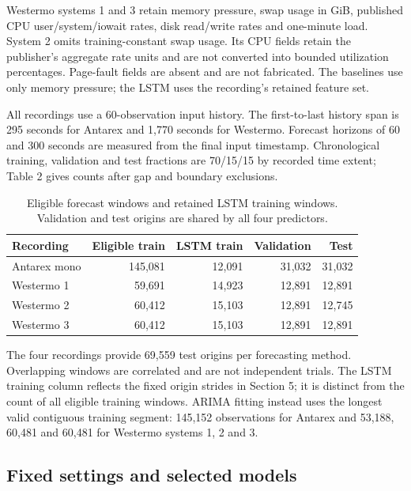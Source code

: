 \documentclass[10pt,a4paper,twocolumn]{article}
\begin{document}
Westermo systems 1 and 3 retain memory pressure, swap usage in GiB, published CPU user/system/iowait rates, disk read/write rates and one-minute load. System 2 omits training-constant swap usage. Its CPU fields retain the publisher's aggregate rate units and are not converted into bounded utilization percentages. Page-fault fields are absent and are not fabricated. The baselines use only memory pressure; the LSTM uses the recording's retained feature set.

All recordings use a 60-observation input history. The first-to-last history span is 295 seconds for Antarex and 1,770 seconds for Westermo. Forecast horizons of 60 and 300 seconds are measured from the final input timestamp. Chronological training, validation and test fractions are 70/15/15 by recorded time extent; Table 2 gives counts after gap and boundary exclusions.

\begin{table}[tbp]
\centering
\caption{Eligible forecast windows and retained LSTM training windows. Validation and test origins are shared by all four predictors.}
\label{tab:2}
\fontsize{8.5}{10.2}\selectfont
\setlength{\tabcolsep}{2.4pt}
\renewcommand{\arraystretch}{1.17}
\begin{tabularx}{\linewidth}{@{}L{1.28}R{1.02}R{0.96}R{0.9}R{0.84}@{}}
\toprule
\textbf{Recording} & \textbf{Eligible train} & \textbf{LSTM train} & \textbf{Validation} & \textbf{Test} \\
\midrule
Antarex mono & 145,081 & 12,091 & 31,032 & 31,032 \\
Westermo 1 & 59,691 & 14,923 & 12,891 & 12,891 \\
Westermo 2 & 60,412 & 15,103 & 12,891 & 12,745 \\
Westermo 3 & 60,412 & 15,103 & 12,891 & 12,891 \\
\bottomrule
\end{tabularx}
\end{table}

The four recordings provide 69,559 test origins per forecasting method. Overlapping windows are correlated and are not independent trials. The LSTM training column reflects the fixed origin strides in Section 5; it is distinct from the count of all eligible training windows. ARIMA fitting instead uses the longest valid contiguous training segment: 145,152 observations for Antarex and 53,188, 60,481 and 60,481 for Westermo systems 1, 2 and 3.

\subsection{Fixed settings and selected models}
\end{document}
